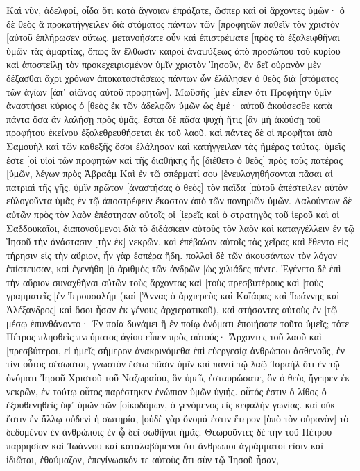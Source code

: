 Καὶ νῦν, ἀδελφοί, οἶδα ὅτι κατὰ ἄγνοιαν ἐπράξατε, ὥσπερ καὶ οἱ ἄρχοντες ὑμῶν· 
ὁ δὲ θεὸς ἃ προκατήγγειλεν διὰ στόματος πάντων τῶν [προφητῶν παθεῖν τὸν χριστὸν [αὐτοῦ ἐπλήρωσεν οὕτως. 
μετανοήσατε οὖν καὶ ἐπιστρέψατε [πρὸς τὸ ἐξαλειφθῆναι ὑμῶν τὰς ἁμαρτίας, 
ὅπως ἂν ἔλθωσιν καιροὶ ἀναψύξεως ἀπὸ προσώπου τοῦ κυρίου καὶ ἀποστείλῃ τὸν προκεχειρισμένον ὑμῖν χριστὸν Ἰησοῦν, 
ὃν δεῖ οὐρανὸν μὲν δέξασθαι ἄχρι χρόνων ἀποκαταστάσεως πάντων ὧν ἐλάλησεν ὁ θεὸς διὰ [στόματος τῶν ἁγίων [ἀπ᾽ αἰῶνος αὐτοῦ προφητῶν]. 
Μωϋσῆς [μὲν εἶπεν ὅτι Προφήτην ὑμῖν ἀναστήσει κύριος ὁ [θεὸς ἐκ τῶν ἀδελφῶν ὑμῶν ὡς ἐμέ· αὐτοῦ ἀκούσεσθε κατὰ πάντα ὅσα ἂν λαλήσῃ πρὸς ὑμᾶς. 
ἔσται δὲ πᾶσα ψυχὴ ἥτις [ἂν μὴ ἀκούσῃ τοῦ προφήτου ἐκείνου ἐξολεθρευθήσεται ἐκ τοῦ λαοῦ. 
καὶ πάντες δὲ οἱ προφῆται ἀπὸ Σαμουὴλ καὶ τῶν καθεξῆς ὅσοι ἐλάλησαν καὶ κατήγγειλαν τὰς ἡμέρας ταύτας. 
ὑμεῖς ἐστε [οἱ υἱοὶ τῶν προφητῶν καὶ τῆς διαθήκης ἧς [διέθετο ὁ θεὸς] πρὸς τοὺς πατέρας [ὑμῶν, λέγων πρὸς Ἀβραάμ Καὶ ἐν τῷ σπέρματί σου [ἐνευλογηθήσονται πᾶσαι αἱ πατριαὶ τῆς γῆς. 
ὑμῖν πρῶτον [ἀναστήσας ὁ θεὸς] τὸν παῖδα [αὐτοῦ ἀπέστειλεν αὐτὸν εὐλογοῦντα ὑμᾶς ἐν τῷ ἀποστρέφειν ἕκαστον ἀπὸ τῶν πονηριῶν ὑμῶν. 
Λαλούντων δὲ αὐτῶν πρὸς τὸν λαὸν ἐπέστησαν αὐτοῖς οἱ [ἱερεῖς καὶ ὁ στρατηγὸς τοῦ ἱεροῦ καὶ οἱ Σαδδουκαῖοι, 
διαπονούμενοι διὰ τὸ διδάσκειν αὐτοὺς τὸν λαὸν καὶ καταγγέλλειν ἐν τῷ Ἰησοῦ τὴν ἀνάστασιν [τὴν ἐκ] νεκρῶν, 
καὶ ἐπέβαλον αὐτοῖς τὰς χεῖρας καὶ ἔθεντο εἰς τήρησιν εἰς τὴν αὔριον, ἦν γὰρ ἑσπέρα ἤδη. 
πολλοὶ δὲ τῶν ἀκουσάντων τὸν λόγον ἐπίστευσαν, καὶ ἐγενήθη [ὁ ἀριθμὸς τῶν ἀνδρῶν [ὡς χιλιάδες πέντε. 
Ἐγένετο δὲ ἐπὶ τὴν αὔριον συναχθῆναι αὐτῶν τοὺς ἄρχοντας καὶ [τοὺς πρεσβυτέρους καὶ [τοὺς γραμματεῖς [ἐν Ἰερουσαλήμ 
(καὶ [Ἅννας ὁ ἀρχιερεὺς καὶ Καϊάφας καὶ Ἰωάννης καὶ Ἀλέξανδρος] καὶ ὅσοι ἦσαν ἐκ γένους ἀρχιερατικοῦ), 
καὶ στήσαντες αὐτοὺς ἐν [τῷ μέσῳ ἐπυνθάνοντο· Ἐν ποίᾳ δυνάμει ἢ ἐν ποίῳ ὀνόματι ἐποιήσατε τοῦτο ὑμεῖς; 
τότε Πέτρος πλησθεὶς πνεύματος ἁγίου εἶπεν πρὸς αὐτούς· Ἄρχοντες τοῦ λαοῦ καὶ [πρεσβύτεροι, 
εἰ ἡμεῖς σήμερον ἀνακρινόμεθα ἐπὶ εὐεργεσίᾳ ἀνθρώπου ἀσθενοῦς, ἐν τίνι οὗτος σέσωσται, 
γνωστὸν ἔστω πᾶσιν ὑμῖν καὶ παντὶ τῷ λαῷ Ἰσραὴλ ὅτι ἐν τῷ ὀνόματι Ἰησοῦ Χριστοῦ τοῦ Ναζωραίου, ὃν ὑμεῖς ἐσταυρώσατε, ὃν ὁ θεὸς ἤγειρεν ἐκ νεκρῶν, ἐν τούτῳ οὗτος παρέστηκεν ἐνώπιον ὑμῶν ὑγιής. 
οὗτός ἐστιν ὁ λίθος ὁ ἐξουθενηθεὶς ὑφ᾽ ὑμῶν τῶν [οἰκοδόμων, ὁ γενόμενος εἰς κεφαλὴν γωνίας. 
καὶ οὐκ ἔστιν ἐν ἄλλῳ οὐδενὶ ἡ σωτηρία, [οὐδὲ γὰρ ὄνομά ἐστιν ἕτερον [ὑπὸ τὸν οὐρανὸν] τὸ δεδομένον ἐν ἀνθρώποις ἐν ᾧ δεῖ σωθῆναι ἡμᾶς. 
Θεωροῦντες δὲ τὴν τοῦ Πέτρου παρρησίαν καὶ Ἰωάννου καὶ καταλαβόμενοι ὅτι ἄνθρωποι ἀγράμματοί εἰσιν καὶ ἰδιῶται, ἐθαύμαζον, ἐπεγίνωσκόν τε αὐτοὺς ὅτι σὺν τῷ Ἰησοῦ ἦσαν, 
